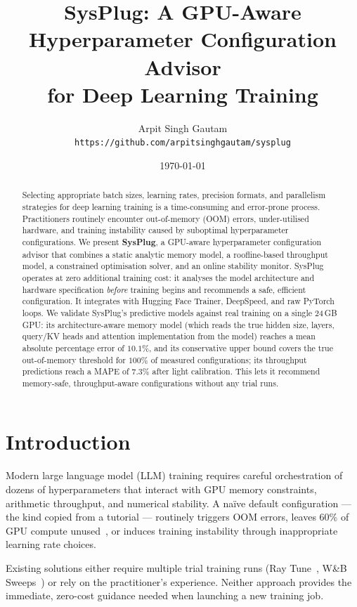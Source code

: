 \documentclass[10pt,twocolumn]{article}
\title{\textbf{SysPlug: A GPU-Aware Hyperparameter Configuration Advisor\\
for Deep Learning Training}}
\author{
  Arpit Singh Gautam\\
  \texttt{https://github.com/arpitsinghgautam/sysplug}
}
\date{\today}
\begin{document}
\maketitle

\begin{abstract}
Selecting appropriate batch sizes, learning rates, precision formats, and
parallelism strategies for deep learning training is a time-consuming and
error-prone process.  Practitioners routinely encounter out-of-memory (OOM)
errors, under-utilised hardware, and training instability caused by
suboptimal hyperparameter configurations.  We present \textbf{SysPlug}, a
GPU-aware hyperparameter configuration advisor that combines a static analytic
memory model, a roofline-based throughput model, a constrained optimisation
solver, and an online stability monitor.  SysPlug operates at zero additional
training cost: it analyses the model architecture and hardware specification
\emph{before} training begins and recommends a safe, efficient configuration.
It integrates with Hugging Face Trainer, DeepSpeed, and raw PyTorch loops.
We validate SysPlug's predictive models against real training on a single
24\,GB GPU: its architecture-aware memory model (which reads the true hidden
size, layers, query/KV heads and attention implementation from the model)
reaches a mean absolute percentage error of $10.1\%$, and its conservative
upper bound covers the true out-of-memory threshold for $100\%$ of measured
configurations; its throughput predictions reach a MAPE of $7.3\%$ after light
calibration. This lets it recommend memory-safe, throughput-aware
configurations without any trial runs.
\end{abstract}

\section{Introduction}

Modern large language model (LLM) training requires careful orchestration of
dozens of hyperparameters that interact with GPU memory constraints, arithmetic
throughput, and numerical stability.  A na\"ive default configuration — the
kind copied from a tutorial — routinely triggers OOM errors, leaves 60\% of
GPU compute unused~\cite{weng2022low}, or induces training instability through
inappropriate learning rate choices.

Existing solutions either require multiple trial training runs (Ray
Tune~\cite{liaw2018tune}, W\&B Sweeps~\cite{wandb2020}) or rely on the
practitioner's experience.  Neither approach provides the immediate,
zero-cost guidance needed when launching a new training job.
\end{document}
